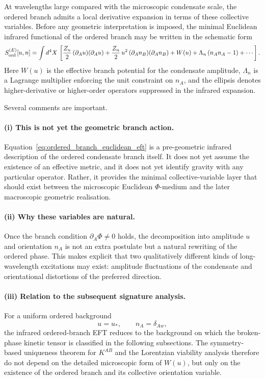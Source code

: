 \documentclass[11pt,a4paper]{article}
\numberwithin{equation}{section}
\begin{document}
At wavelengths large compared with the microscopic condensate scale,
the ordered branch admits a local derivative expansion in terms of
these collective variables.
Before any geometric interpretation is imposed, the minimal Euclidean
infrared functional of the ordered branch may be written in the
schematic form
\begin{equation}
  \label{eq:ordered_branch_euclidean_eft}
  S_{\rm ord}^{(E)}[u,n]
  =
  \int d^4X\,
  \left[
    \frac{Z_u}{2}\,(\partial_A u)(\partial_A u)
    + \frac{Z_n}{2}\,u^2\,(\partial_A n_B)(\partial_A n_B)
    + W(u)
    + \Lambda_n\,(n_A n_A - 1)
    + \cdots
  \right].
\end{equation}
Here $W(u)$ is the effective branch potential for the condensate
amplitude, $\Lambda_n$ is a Lagrange multiplier enforcing the unit
constraint on $n_A$, and the ellipsis denotes higher-derivative or
higher-order operators suppressed in the infrared expansion.

Several comments are important.

\paragraph{(i) This is not yet the geometric branch action.}
Equation~\eqref{eq:ordered_branch_euclidean_eft} is a pre-geometric
infrared description of the ordered condensate branch itself.
It does not yet assume the existence of an effective metric, and it
does not yet identify gravity with any particular operator.
Rather, it provides the minimal collective-variable layer that should
exist between the microscopic Euclidean $\Phi$-medium and the later
macroscopic geometric realisation.

\paragraph{(ii) Why these variables are natural.}
Once the branch condition $\partial_A\Phi\neq 0$ holds, the
decomposition into amplitude $u$ and orientation $n_A$ is not an
extra postulate but a natural rewriting of the ordered phase.
This makes explicit that two qualitatively different kinds of
long-wavelength excitations may exist: amplitude fluctuations of the
condensate and orientational distortions of the preferred direction.

\paragraph{(iii) Relation to the subsequent signature analysis.}
For a uniform ordered background
\[
u = u_*,
\qquad
n_A = \delta_{Aw},
\]
the infrared ordered-branch EFT reduces to the background on which
the broken-phase kinetic tensor is classified in the following subsections.
The symmetry-based uniqueness theorem for $K^{AB}$ and the Lorentzian
viability analysis therefore do not depend on the detailed microscopic
form of $W(u)$, but only on the existence of the ordered branch and
its collective orientation variable.
\end{document}
